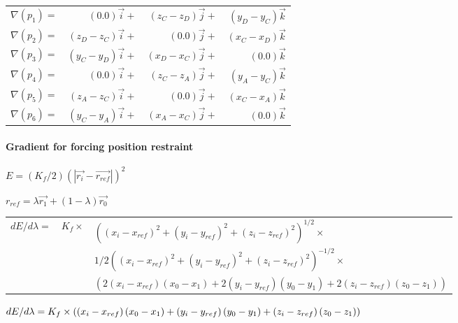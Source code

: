 \begin{tabular}{lrrr}
$\nabla (p_{1})=$ & $(0.0)\overrightarrow{i}+$ & $(z_{C}-z_{D})%
\overrightarrow{j}+$ & $(y_{D}-y_{C})\overrightarrow{k}$ \\ 
$\nabla (p_{2})=$ & $(z_{D}-z_{C})\overrightarrow{i}+$ & $(0.0)%
\overrightarrow{j}+$ & $(x_{C}-x_{D})\overrightarrow{k}$ \\ 
$\nabla (p_{3})=$ & $(y_{C}-y_{D})\overrightarrow{i}+$ & $(x_{D}-x_{C})%
\overrightarrow{j}+$ & $(0.0)\overrightarrow{k}$ \\ 
$\nabla (p_{4})=$ & $(0.0)\overrightarrow{i}+$ & $(z_{C}-z_{A})%
\overrightarrow{j}+$ & $(y_{A}-y_{C})\overrightarrow{k}$ \\ 
$\nabla (p_{5})=$ & $(z_{A}-z_{C})\overrightarrow{i}+$ & $(0.0)%
\overrightarrow{j}+$ & $(x_{C}-x_{A})\overrightarrow{k}$ \\ 
$\nabla (p_{6})=$ & $(y_{C}-y_{A})\overrightarrow{i}+$ & $(x_{A}-x_{C})%
\overrightarrow{j}+$ & $(0.0)\overrightarrow{k}$%
\end{tabular}
\pagebreak 

\paragraph*{Gradient for forcing position restraint}

$E=(K_{f}/2)\left( \left| \overrightarrow{r_{i}}-\overrightarrow{r_{ref}}%
\right| \right) ^{2}$

$r_{ref}=\lambda \overrightarrow{r_{1}}+\left( 1-\lambda \right) 
\overrightarrow{r_{0}}$

\begin{tabular}{lll}
$dE/d\lambda =$ & $K_{f}\times $ & $\left( \left( x_{i}-x_{ref}\right)
^{2}+\left( y_{i}-y_{ref}\right) ^{2}+\left( z_{i}-z_{ref}\right)
^{2}\right) ^{1/2}\times $ \\ 
&  & $1/2\left( \left( x_{i}-x_{ref}\right) ^{2}+\left( y_{i}-y_{ref}\right)
^{2}+\left( z_{i}-z_{ref}\right) ^{2}\right) ^{-1/2}\times $ \\ 
&  & $\left( 2\left( x_{i}-x_{ref}\right) \left( x_{0}-x_{1}\right) +2\left(
y_{i}-y_{ref}\right) \left( y_{0}-y_{1}\right) +2\left( z_{i}-z_{ref}\right)
\left( z_{0}-z_{1}\right) \right) $%
\end{tabular}

$dE/d\lambda =K_{f}\times \left( \left( x_{i}-x_{ref}\right) \left(
x_{0}-x_{1}\right) +\left( y_{i}-y_{ref}\right) \left( y_{0}-y_{1}\right)
+\left( z_{i}-z_{ref}\right) \left( z_{0}-z_{1}\right) \right) \bigskip $

